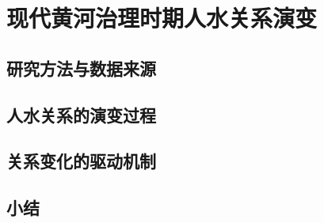 \chapter{现代黄河治理时期人水关系演变}\label{cha:4}


\section{研究方法与数据来源}\label{ch4:methods}


\section{人水关系的演变过程}\label{ch4:process}


\section{关系变化的驱动机制}\label{ch4:mechanism}




\section{小结}\label{ch4:summary}

